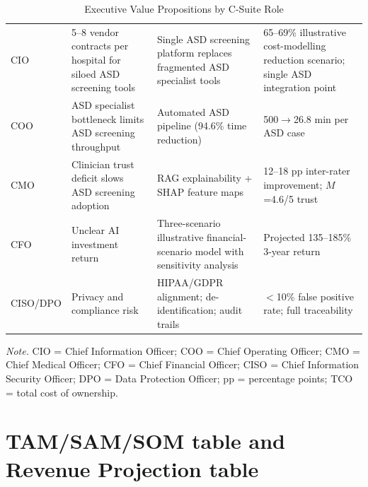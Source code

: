 {\tablestripes\tablefontsize
{}
\begin{xltabular}{\textwidth}{@{} p{1.0cm} p{4.2cm} p{4.6cm} p{4.3cm} @{}}
\caption[Executive Value Propositions by C-Suite Role]{Executive Value Propositions by C-Suite Role}\label{tab:executive_implications} \\
\toprule
{} &  &  &  \\
\midrule
\endfirsthead
\endhead
\bottomrule
\endlastfoot
CIO & 5--8 vendor contracts per hospital for siloed ASD screening tools & Single ASD screening platform replaces fragmented ASD specialist tools & 65--69\% illustrative cost-modelling reduction scenario; single ASD integration point \\
\addlinespace
COO & ASD specialist bottleneck limits ASD screening throughput & Automated ASD pipeline (94.6\% time reduction) & 500$\to$26.8 min per ASD case~\cite{rajkomar2019healthcare} \\
\addlinespace
CMO & Clinician trust deficit slows ASD screening adoption & RAG explainability + SHAP feature maps & 12--18 pp inter-rater improvement; $M$=4.6/5 trust \\
\addlinespace
CFO & Unclear AI investment return & Three-scenario illustrative financial-scenario model with sensitivity analysis & Projected 135--185\% 3-year return \\
\addlinespace
CISO/DPO & Privacy and compliance risk & HIPAA/GDPR alignment; de-identification; audit trails & $<$10\% false positive rate; full traceability \\
\end{xltabular}}
\vspace{0.5em}\noindent\textit{Note.} CIO = Chief Information Officer; COO = Chief Operating Officer; CMO = Chief Medical Officer; CFO = Chief Financial Officer; CISO = Chief Information Security Officer; DPO = Data Protection Officer; pp = percentage points; TCO = total cost of ownership.

\section{TAM/SAM/SOM table and Revenue Projection table}
\label{sec:appendix_ch5_s4}

